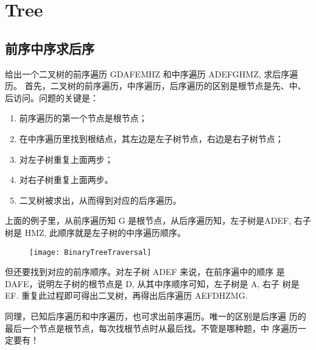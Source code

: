 \chapter{Tree}
\label{cha:tree}

\section{前序中序求后序}

给出一个二叉树的前序遍历 GDAFEMHZ 和中序遍历 ADEFGHMZ, 求后序遍历。
首先，二叉树的前序遍历，中序遍历，后序遍历的区别是根节点是先、中、
后访问。问题的关键是：

\begin{enumerate}
\item 前序遍历的第一个节点是根节点；
\item 在中序遍历里找到根结点，其左边是左子树节点，右边是右子树节点；
\item 对左子树重复上面两步；
\item 对右子树重复上面两步。
\item 二叉树被求出，从而得到对应的后序遍历。
\end{enumerate}

上面的例子里，从前序遍历知 G 是根节点，从后序遍历知，左子树是ADEF,
右子树是 HMZ, 此顺序就是左子树的中序遍历顺序。

\begin{figure}[h]
  \centering
  \texttt{[image: BinaryTreeTraversal]}
\end{figure}

但还要找到对应的前序顺序。对左子树 ADEF 来说，在前序遍中的顺序
是 DAFE，说明左子树的根节点是 D, 从其中序顺序可知，左子树是 A, 右子
树是 EF. 重复此过程即可得出二叉树，再得出后序遍历 AEFDHZMG.

同理，已知后序遍历和中序遍历，也可求出前序遍历。唯一的区别是后序遍
历的最后一个节点是根节点，每次找根节点时从最后找。不管是哪种题，中
序遍历一定要有！


